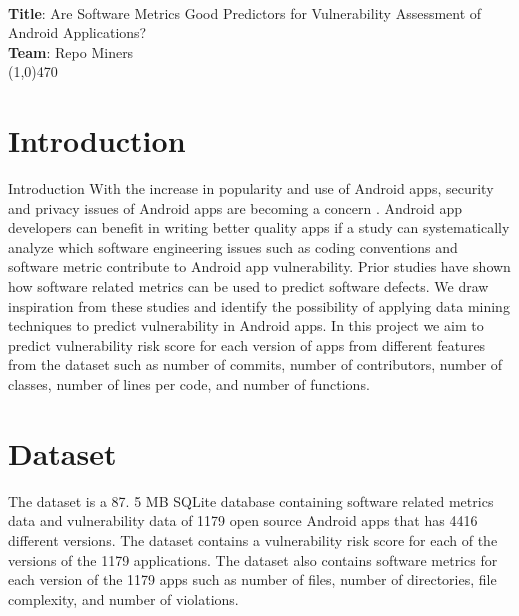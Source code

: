 \documentclass[11pt]{article} %
\begin{document}
\\
\textbf{Title}: Are Software Metrics Good Predictors for Vulnerability Assessment of Android Applications?  
\\
\textbf{Team}: Repo Miners \\
\line(1,0){470}

\section{Introduction}
Introduction 
With the increase in popularity and use of Android apps, security and privacy issues of Android apps are becoming a concern \cite{01}\cite{03}. Android app developers can benefit in writing better quality apps if a study can systematically analyze which software engineering issues such as coding conventions and software metric contribute to Android app vulnerability. Prior studies have shown how software related metrics can be used to predict software defects. We draw inspiration from these studies and identify the possibility of applying data mining techniques to predict vulnerability in Android apps. In this project we aim to predict vulnerability risk score for each version of apps from different features from the dataset such as number of commits, number of contributors, number of classes, number of lines per code, and number of functions.  

\section{Dataset}
The dataset \cite{02} is a 87. 5 MB SQLite database containing software related metrics data and vulnerability data of 1179 open source Android apps that has 4416 different versions. The dataset contains a vulnerability risk score for each of the versions of the 1179 applications. The dataset also contains software metrics for each version of the 1179 apps such as number of files, number of directories, file complexity, and number of violations. 
\end{document}
